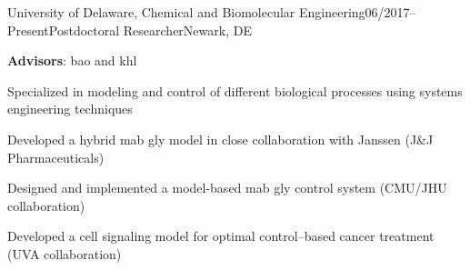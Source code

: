 \begin{rSubsection}{University of Delaware, Chemical and Biomolecular Engineering}{06/2017--Present}{Postdoctoral Researcher}{Newark, DE}
\item {\bf Advisors}: \gls{bao} and \gls{khl} 
\smallskip
\item Specialized in
modeling and control of
different biological processes using
systems engineering techniques
\item %
Developed 
a %
hybrid %
\gls{mab} \gls{gly} model %
in close collaboration with %
Janssen (J\&J Pharmaceuticals) 
\item 
Designed and implemented a model-based \gls{mab}
\gls{gly} control system
(CMU/JHU collaboration) %
\item Developed %
a
cell %
signaling model for
optimal control--based %
cancer treatment 
(UVA collaboration)

\end{rSubsection}
